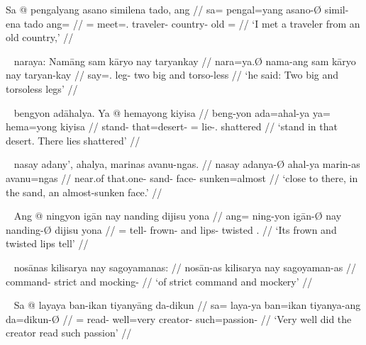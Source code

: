 
\ex\begingl
	\gla Sa @ pengalyang asano similena tado, ang //
	\glb sa= pengal=yang asano-Ø simil-ena tado ang= //
	\glc \PatT{}= meet=\Fsg{}.\Aarg{} traveler-\Top{} country-\Gen{} old 
		\AgtT{}= //
	\glft `I met a traveler from an old country,' //
\endgl\xe

\ex~\begingl
	\gla naraya: Namāng sam kāryo nay taryankay //
	\glb nara=ya.Ø nama-ang sam kāryo nay taryan-kay //
	\glc say=\TsgM{}.\Top{} leg-\Aarg{} two big and torso-less //
	\glft `he said: Two big and torsoless legs' //
\endgl\xe

\ex~\begingl
	\gla bengyon adāhalya. Ya @ hemayong kiyisa //
	\glb beng-yon ada=ahal-ya ya= hema=yong kiyisa //
	\glc stand-\TplN{} that=desert-\Loc{} \LocT{}= lie-\TsgN{}.\Aarg{} 
		shattered //
	\glft `stand in that desert. There lies shattered' //
\endgl\xe

\ex~\begingl
	\gla nasay adany', ahalya, marinas avanu-ngas. //
	\glb nasay adanya-Ø ahal-ya marin-as avanu=ngas //
	\glc near.of that.one-\Top{} sand-\Loc{} face-\Parg{} sunken=almost //
	\glft `close to there, in the sand, an almost-sunken face.' //
\endgl\xe

\ex~\begingl
	\gla Ang @ ningyon igān nay nanding dijisu yona //
	\glb ang= ning-yon igān-Ø nay nanding-Ø dijisu yona //
	\glc \AgtT{}= tell-\TplN{} frown-\Top{} and lips-\Top{} twisted 
		\TsgN{}.\Gen{} //
	\glft `Its frown and twisted lips tell' //
\endgl\xe

\ex~\begingl
	\gla nosānas kilisarya nay sagoyamanas: //
	\glb nosān-as kilisarya nay sagoyaman-as //
	\glc command-\Parg{} strict and mocking-\Parg{} //
	\glft `of strict command and mockery' //
\endgl\xe

\ex~\begingl
	\gla Sa @ layaya ban-ikan tiyanyāng da-dikun //
	\glb sa= laya-ya ban=ikan tiyanya-ang da=dikun-Ø //
	\glc \PatT{}= read-\TsgM{} well=very creator-\Aarg{} such=passion-\Top{} //
	\glft `Very well did the creator read such passion' //
\endgl\xe

